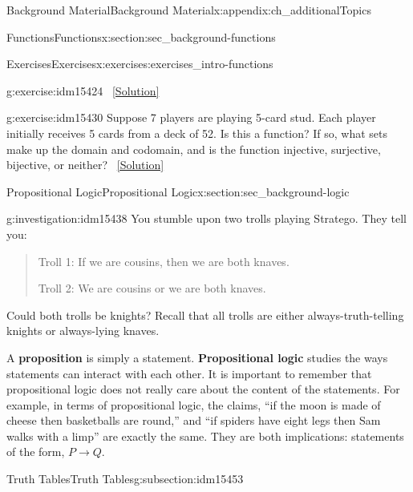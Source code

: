 \documentclass[oneside,10pt,]{book}
\newcommand{\terminology}[1]{\textbf{#1}}
\numberwithin{equation}{chapter}
\def\imp{\rightarrow}
\begin{document}
\begin{appendixptx}{Background Material}{}{Background Material}{}{}{x:appendix:ch_additionalTopics}
\begin{sectionptx}{Functions}{}{Functions}{}{}{x:section:sec_background-functions}
\begin{exercises-subsection}{Exercises}{}{Exercises}{}{}{x:exercises:exercises_intro-functions}
\begin{divisionexercise}{16}{}{}{g:exercise:idm15424}
\qquad~\hfill{\tiny\hyperlink{g:solution:idm15428-main}{[Solution]}}\end{divisionexercise}%
\begin{divisionexercise}{17}{}{}{g:exercise:idm15430}%
Suppose 7 players are playing 5-card stud. Each player initially receives 5 cards from a deck of 52. Is this a function? If so, what sets make up the domain and codomain, and is the function injective, surjective, bijective, or neither?%
\qquad~\hfill{\tiny\hyperlink{g:solution:idm15433-main}{[Solution]}}\end{divisionexercise}%
\end{exercises-subsection}
\end{sectionptx}
%
%
\typeout{************************************************}
\typeout{************************************************}
%
\begin{sectionptx}{Propositional Logic}{}{Propositional Logic}{}{}{x:section:sec_background-logic}
\begin{introduction}{}%
\begin{investigation}{}{g:investigation:idm15438}%
You stumble upon two trolls playing Stratego\textregistered{}.  They tell you:%
\begin{quote}%
Troll 1: If we are cousins, then we are both knaves.%
\par
Troll 2: We are cousins or we are both knaves.%
\end{quote}
Could both trolls be knights?  Recall that all trolls are either always-truth-telling knights or always-lying knaves.%
\end{investigation}
A \terminology{proposition} is simply a statement. \terminology{Propositional logic} studies the ways statements can interact with each other. It is important to remember that propositional logic does not really care about the content of the statements. For example, in terms of propositional logic, the claims, ``if the moon is made of cheese then basketballs are round,'' and ``if spiders have eight legs then Sam walks with a limp'' are exactly the same. They are both implications: statements of the form, \(P \imp Q\).%
\end{introduction}%
%
%
\typeout{************************************************}
\typeout{************************************************}
%
\begin{subsectionptx}{Truth Tables}{}{Truth Tables}{}{}{g:subsection:idm15453}
%

\end{subsectionptx}
\end{sectionptx}
\end{appendixptx}
\end{document}
